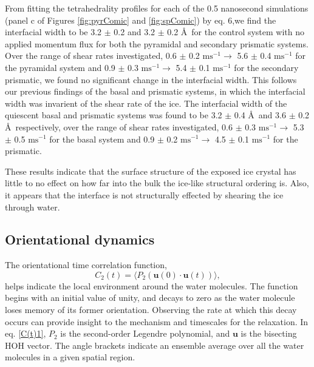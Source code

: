 \documentclass{pnastwo}
\begin{document}
\begin{article}
From fitting the tetrahedrality profiles for each of the 0.5 nanosecond 
simulations (panel c of Figures \ref{fig:pyrComic} and \ref{fig:spComic}) 
by eq. 6\cite{Louden13},we find the interfacial width to be
 3.2 $\pm$ 0.2 and 3.2 $\pm$ 0.2 \AA\ for the control system with no applied 
momentum flux for both the pyramidal and secondary prismatic systems. 
Over the range of shear rates investigated, 
0.6 $\pm$ 0.2 $\mathrm{ms}^{-1} \rightarrow$ 5.6 $\pm$ 0.4 $\mathrm{ms}^{-1}$ 
for the pyramidal system and 0.9 $\pm$ 0.3 $\mathrm{ms}^{-1} \rightarrow$ 5.4
$\pm$ 0.1 $\mathrm{ms}^{-1}$ for the secondary prismatic, we found no 
significant change in the interfacial width. This follows our previous 
findings of the basal and
prismatic systems, in which the interfacial width was invarient of the
shear rate of the ice. The interfacial width of the quiescent basal and 
prismatic systems was found to be 3.2 $\pm$ 0.4 \AA\ and 3.6 $\pm$ 0.2 \AA\ 
respectively, over the range of shear rates investigated, 0.6 $\pm$ 0.3 
$\mathrm{ms}^{-1} \rightarrow$ 5.3 $\pm$ 0.5 $\mathrm{ms}^{-1}$ for the basal 
system and 0.9 $\pm$ 0.2 $\mathrm{ms}^{-1} \rightarrow$ 4.5 $\pm$ 0.1 
$\mathrm{ms}^{-1}$ for the prismatic.

These results indicate that the surface structure of the exposed ice crystal
has little to no effect on how far into the bulk the ice-like structural 
ordering is. Also, it appears that the interface is not structurally effected
by shearing the ice through water. 


\subsection{Orientational dynamics}
The orientational time correlation function,
\begin{equation}\label{C(t)1}
  C_{2}(t)=\langle P_{2}(\mathbf{u}(0)\cdot \mathbf{u}(t))\rangle,
\end{equation}
helps indicate the local environment around the water molecules. The function 
begins with an initial value of unity, and decays to zero as the water molecule
loses memory of its former orientation. Observing the rate at which this decay
occurs can provide insight to the mechanism and timescales for the relaxation.
In eq. \eqref{C(t)1}, $P_{2}$ is the second-order Legendre polynomial, and 
$\mathbf{u}$ is the bisecting HOH vector. The angle brackets indicate
an ensemble average over all the water molecules in a given spatial region.


\end{article}
\end{document}
